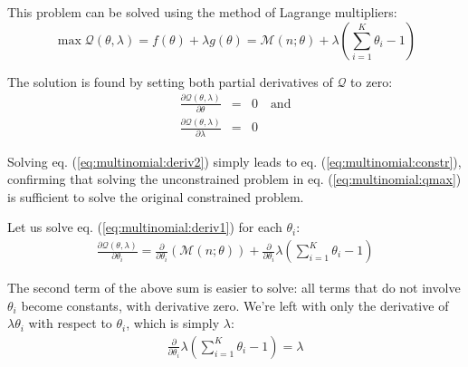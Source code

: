 This problem can be solved using the method of Lagrange multipliers:
\begin{equation}
\max \mathcal{Q}(\theta, \lambda) = f(\theta) + \lambda g(\theta) =
\mathcal{M}(n;\theta)  + \lambda \left( \sum_{i=1}^K \theta_i - 1 \right)
\label{eq:multinomial:qmax}
\end{equation}

The solution is found by setting both partial derivatives of $\mathcal{Q}$ to zero:
\begin{eqnarray}
\frac{\partial \mathcal{Q}(\theta, \lambda)}{\partial \theta} & = & 0  \quad \text{and} 
\label{eq:multinomial:deriv1}
\\
\frac{\partial \mathcal{Q}(\theta, \lambda)}{\partial \lambda} & = & 0 
\label{eq:multinomial:deriv2}
\end{eqnarray}

Solving eq. (\ref{eq:multinomial:deriv2}) simply leads to eq. (\ref{eq:multinomial:constr}), confirming that solving the unconstrained problem in eq. (\ref{eq:multinomial:qmax}) is sufficient to solve the original constrained problem.

Let us solve eq. (\ref{eq:multinomial:deriv1}) for each $\theta_i$:
\begin{eqnarray}
\frac{\partial \mathcal{Q}(\theta, \lambda)}{\partial \theta_i} =
\frac{\partial}{\partial \theta_i}
   \left( \mathcal{M}(n;\theta) \right) + 
\frac{\partial}{\partial \theta_i}
   \lambda \left( \sum_{i=1}^K \theta_i - 1 \right)
\label{eq:multinomial:deriv1:sol0}
\end{eqnarray}

The second term of the above sum is easier to solve: all terms that do not involve $\theta_i$ become constants, with derivative zero. We're left with only the derivative of $\lambda \theta_i$ with respect to $\theta_i$, which is simply $\lambda$:
\begin{eqnarray}
\frac{\partial}{\partial \theta_i}
   \lambda \left( \sum_{i=1}^K \theta_i - 1 \right) =
\lambda
\label{eq:multinomial:deriv1:sol2}
\end{eqnarray}

